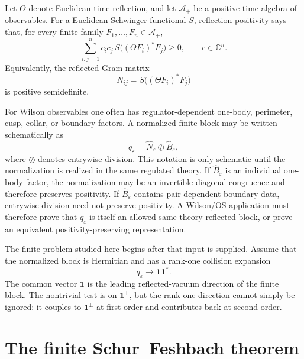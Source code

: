 \documentclass[11pt]{article}
\newcommand{\one}{\mathbf 1}
\newcommand{\C}{\mathbb C}
\newcommand{\eps}{\varepsilon}
\newcommand{\odiv}{\oslash}
\begin{document}
Let \(\Theta\) denote Euclidean time reflection, and let \(\mathcal A_+\) be a positive-time algebra of observables.  For a Euclidean Schwinger functional \(S\), reflection positivity says that, for every finite family \(F_1,\ldots,F_n\in\mathcal A_+\),
\begin{equation}
  \sum_{i,j=1}^n \overline{c_i}c_j\,S\bigl((\Theta F_i)^*F_j\bigr)\ge 0,
  \qquad c\in\C^n.
  \label{eq:os-pos}
\end{equation}
Equivalently, the reflected Gram matrix
\begin{equation}
  N_{ij}=S\bigl((\Theta F_i)^*F_j\bigr)
  \label{eq:reflected-gram}
\end{equation}
is positive semidefinite.

For Wilson observables one often has regulator-dependent one-body, perimeter, cusp, collar, or boundary factors.  A normalized finite block may be written schematically as
\begin{equation}
  q_\eps=\widehat N_\eps \odiv \widehat B_\eps,
  \label{eq:quotient}
\end{equation}
where \(\odiv\) denotes entrywise division.  This notation is only schematic until the normalization is realized in the same regulated theory.  If \(\widehat B_\eps\) is an individual one-body factor, the normalization may be an invertible diagonal congruence and therefore preserves positivity.  If \(\widehat B_\eps\) contains pair-dependent boundary data, entrywise division need not preserve positivity.  A Wilson/OS application must therefore prove that \(q_\eps\) is itself an allowed same-theory reflected block, or prove an equivalent positivity-preserving representation.

The finite problem studied here begins after that input is supplied.  Assume that the normalized block is Hermitian and has a rank-one collision expansion
\begin{equation}
  q_\eps\longrightarrow \one\one^*.
  \label{eq:rank-one-limit}
\end{equation}
The common vector \(\one\) is the leading reflected-vacuum direction of the finite block.  The nontrivial test is on \(\one^\perp\), but the rank-one direction cannot simply be ignored: it couples to \(\one^\perp\) at first order and contributes back at second order.

\section{The finite Schur--Feshbach theorem}
\end{document}

